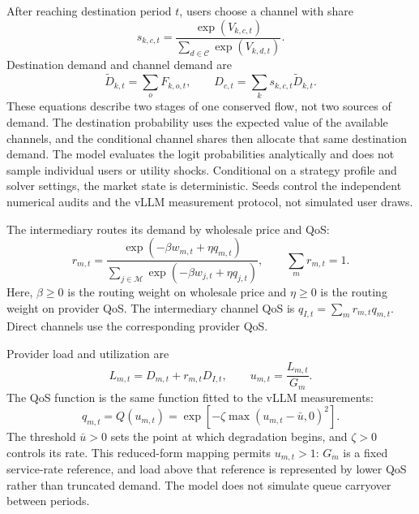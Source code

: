 \documentclass[11pt,a4paper]{article}
\newcommand{\M}{\mathcal{M}}
\newcommand{\Channels}{\mathcal{C}}
\begin{document}
After reaching destination period $t$, users choose a channel with share
\begin{equation}
s_{k,c,t}=\frac{\exp(V_{k,c,t})}{\sum_{d\in\Channels}\exp(V_{k,d,t})}.
\label{eq:channel_share}
\end{equation}
Destination demand and channel demand are
\begin{equation}
\widetilde D_{k,t}=\sum_o F_{k,o,t},
\qquad
D_{c,t}=\sum_k s_{k,c,t}\widetilde D_{k,t}.
\label{eq:channel_demand}
\end{equation}
These equations describe two stages of one conserved flow, not two sources of demand. The destination probability uses the expected value of the available channels, and the conditional channel shares then allocate that same destination demand.
The model evaluates the logit probabilities analytically and does not sample individual users or utility shocks. Conditional on a strategy profile and solver settings, the market state is deterministic. Seeds control the independent numerical audits and the vLLM measurement protocol, not simulated user draws.

The intermediary routes its demand by wholesale price and QoS:
\begin{equation}
r_{m,t}=
\frac{\exp(-\beta w_{m,t}+\eta q_{m,t})}
{\sum_{j\in\M}\exp(-\beta w_{j,t}+\eta q_{j,t})},
\qquad \sum_m r_{m,t}=1.
\label{eq:routing}
\end{equation}
Here, $\beta\ge0$ is the routing weight on wholesale price and $\eta\ge0$ is the routing weight on provider QoS. The intermediary channel QoS is $q_{I,t}=\sum_m r_{m,t}q_{m,t}$. Direct channels use the corresponding provider QoS.

Provider load and utilization are
\begin{equation}
L_{m,t}=D_{m,t}+r_{m,t}D_{I,t},
\qquad
u_{m,t}=\frac{L_{m,t}}{G_m}.
\label{eq:load_utilisation}
\end{equation}
The QoS function is the same function fitted to the vLLM measurements:
\begin{equation}
q_{m,t}=Q(u_{m,t})
=\exp\left[-\zeta\max(u_{m,t}-\bar u,0)^2\right].
\label{eq:qos}
\end{equation}
The threshold $\bar u>0$ sets the point at which degradation begins, and $\zeta>0$ controls its rate.
This reduced-form mapping permits $u_{m,t}>1$: $G_m$ is a fixed service-rate reference, and load above that reference is represented by lower QoS rather than truncated demand. The model does not simulate queue carryover between periods.
\end{document}
